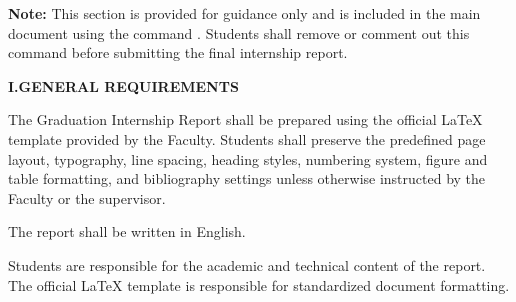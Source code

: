 {\fontsize{13pt}{17pt}\selectfont
{}
\justifying

\newcommand{\RegSection}[2]{%
    \par\vspace{0.45cm}\noindent
    {\fontsize{15pt}{19pt}\selectfont\bfseries #1.\quad #2}\par
    \vspace{0.12cm}}
\newcommand{\RegSubsection}[1]{%
    \par\vspace{0.18cm}\noindent
    {\fontsize{13pt}{17pt}\selectfont\bfseries #1}\par
    \vspace{0.06cm}}
\newcommand{\RegExample}{\textbf{Example.}\quad}


\noindent
\textbf{Note:}
This section is provided for guidance only and is included in the main
document using the command \verb||.
Students shall remove or comment out this command before submitting the
final internship report.

\vspace{0.4cm}


\noindent
\RegSection{I}{GENERAL REQUIREMENTS}

\vspace{0.15cm}

The Graduation Internship Report shall be prepared using the official
\LaTeX{} template provided by the Faculty. Students shall preserve the
predefined page layout, typography, line spacing, heading styles,
numbering system, figure and table formatting, and bibliography settings
unless otherwise instructed by the Faculty or the supervisor.

The report shall be written in English.

Students are responsible for the academic and technical content of the
report. The official \LaTeX{} template is responsible for standardized
document formatting.

\vspace{0.3cm}


}
